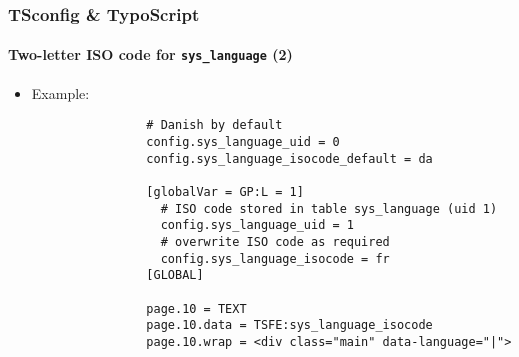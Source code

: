 \begin{frame}[fragile]
	\frametitle{TSconfig \& TypoScript}
	\framesubtitle{Two-letter ISO code for \texttt{sys\_language} (2)}

	\begin{itemize}
		\item Example:

			\begin{lstlisting}
				# Danish by default
				config.sys_language_uid = 0
				config.sys_language_isocode_default = da

				[globalVar = GP:L = 1]
				  # ISO code stored in table sys_language (uid 1)
				  config.sys_language_uid = 1
				  # overwrite ISO code as required
				  config.sys_language_isocode = fr
				[GLOBAL]

				page.10 = TEXT
				page.10.data = TSFE:sys_language_isocode
				page.10.wrap = <div class="main" data-language="|">
			\end{lstlisting}

	\end{itemize}

\end{frame}


